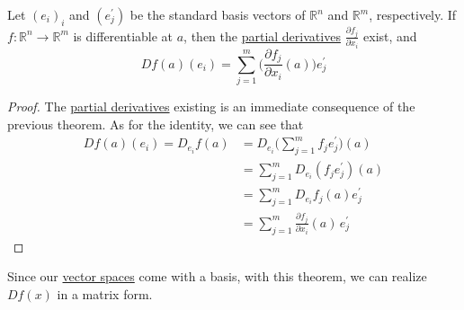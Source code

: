 	\begin{lemma}
	  \label{thm:action-of-derivative-on-basis-vectors}
		Let $(e_i)_i$ and $(e_j^\prime)$ be the standard basis vectors of $\mathbb{R}^n$ and $\mathbb{R}^m$, respectively. If $f: \mathbb{R}^n \to \mathbb{R}^m$ is differentiable at $a$, then the \hyperref[def:partial-derivative]{partial derivatives} $\frac{\partial f_j}{\partial x_i}$ exist, and 
		\begin{equation}
			Df(a) (e_i) = \sum_{j = 1}^m \bigg(\frac{\partial f_j}{\partial x_i} (a) \bigg) e_j^\prime
		\end{equation}
	\end{lemma}
	\begin{proof}
		The \hyperref[def:partial-derivative]{partial derivatives} existing is an immediate consequence of the previous theorem. As for the identity, we can see that 
		\begin{align}
			Df(a) (e_i) = D_{e_i} f(a) & = D_{e_i} \bigg( \sum_{j=1}^m f_j e_j^\prime \bigg)(a) \\ 
															 & = \sum_{j=1}^m D_{e_i} (f_j e_j^\prime)(a) \\ 
															 & = \sum_{j=1}^m D_{e_i} f_j(a) e_j^\prime \\ 
															 & = \sum_{j=1}^m \frac{\partial f_j}{\partial x_i} (a) \, e_j^\prime
		\end{align}
	\end{proof}

	Since our \hyperref[lin-def:vector-space]{vector spaces} come with a basis, with this theorem, we can realize $Df(x)$ in a matrix form. 

